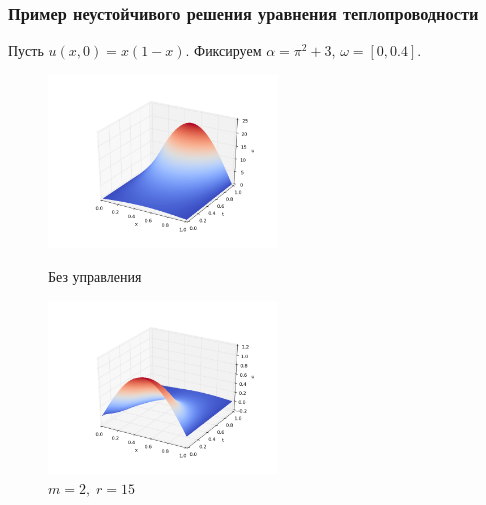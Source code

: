 \documentclass{beamer}
\begin{document}
\begin{frame}
\frametitle{Пример неустойчивого решения уравнения теплопроводности}

Пусть $u(x, 0) = x(1 - x)$. Фиксируем $\alpha = \pi^2 + 3$, $\omega = [0, 0.4]$. 


\begin{figure}[H]
\centering
\begin{minipage}{.5\textwidth}
  \centering
  \includegraphics[width=2.4in]{par_ex_pi3}
  \caption{Без управления}
  \label{fig:test1}
\end{minipage}%
\begin{minipage}{.5\textwidth}
  \centering
  \includegraphics[width=2.4in]{par_re_pi3}
  \caption{$m = 2,\; r = 15$}
  \label{fig:test2}
\end{minipage}
\end{figure}

\end{frame}
\end{document}
